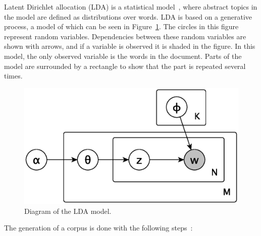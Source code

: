 Latent Dirichlet allocation (LDA) is a statistical model~\cite{blei2003latent}, where abstract topics in the model are defined as distributions over words.
LDA is based on a generative process, a model of which can be seen in Figure~\ref{fig:lda_gen_process}.
The circles in this figure represent random variables.
Dependencies between these random variables are shown with arrows, and if a variable is observed it is shaded in the figure.
In this model, the only observed variable is the words in the document.
Parts of the model are surrounded by a rectangle to show that the part is repeated several times.

\begin{figure}[!ht]
\includegraphics[scale=0.7]{figures/lda-generative-process.eps}
\caption{Diagram of the LDA model.}\label{fig:lda_gen_process}
\end{figure}

The generation of a corpus is done with the following steps~\cite{crain2012dimensionality, blei2003latent}:

